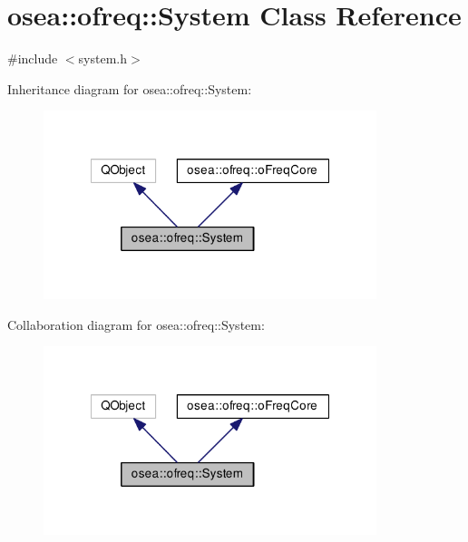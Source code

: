 \hypertarget{classosea_1_1ofreq_1_1_system}{\section{osea\-:\-:ofreq\-:\-:System Class Reference}
\label{classosea_1_1ofreq_1_1_system}
}


{\ttfamily \#include $<$system.\-h$>$}



Inheritance diagram for osea\-:\-:ofreq\-:\-:System\-:\nopagebreak
\begin{figure}[H]
\begin{center}
\leavevmode
\includegraphics[width=275pt]{classosea_1_1ofreq_1_1_system__inherit__graph}
\end{center}
\end{figure}


Collaboration diagram for osea\-:\-:ofreq\-:\-:System\-:\nopagebreak
\begin{figure}[H]
\begin{center}
\leavevmode
\includegraphics[width=275pt]{classosea_1_1ofreq_1_1_system__coll__graph}
\end{center}
\end{figure}
